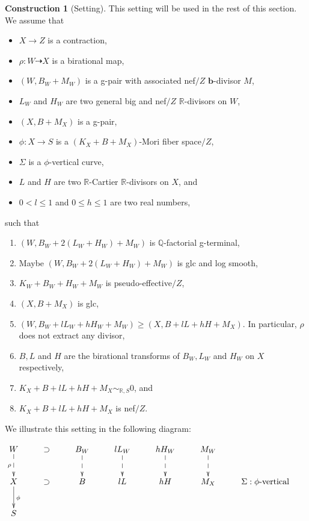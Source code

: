 \documentclass[11pt]{amsart}
\numberwithin{equation}{section}
\newcommand{\bb}{\bm{b}}
\newcommand{\Qq}{\mathbb{Q}}
\newcommand{\Rr}{\mathbb{R}}
\theoremstyle{definition}
\theoremstyle{definition}
\newtheorem{cons}[thm]{Construction}
\theoremstyle{definition}
\begin{document}
\begin{cons}[Setting]\label{cons: setting for sarkisov link}
This setting will be used in the rest of this section. We assume that
\begin{itemize}
    \item $X\rightarrow Z$ is a contraction,
    \item $\rho: W\dashrightarrow X$ is a birational map,
    \item $(W,B_W+M_W)$ is a g-pair with associated nef$/Z$ $\bb$-divisor $M$,
    \item $L_W$ and $H_W$ are two general big and nef$/Z$ $\Rr$-divisors on $W$, 
    \item $(X,B+M_X)$ is a g-pair, 
    \item $\phi: X\rightarrow S$ is a $(K_X+B+M_X)$-Mori fiber space$/Z$,
    \item $\Sigma$ is a $\phi$-vertical curve,
    \item $L$ and $H$ are two $\Rr$-Cartier $\Rr$-divisors on $X$, and
    \item $0<l\leq 1$ and $0\leq h\leq 1$ are two real numbers,
\end{itemize} 
such that
\begin{enumerate}
    \item $(W,B_W+2(L_W+H_W)+M_W)$ is $\Qq$-factorial g-terminal, 
    \item Maybe $(W,B_W+2(L_W+H_W)+M_W)$ is glc and log smooth, 
    \item $K_W+B_W+H_W+M_W$ is pseudo-effective$/Z$,
    \item $(X,B+M_X)$ is glc,
    \item $(W,B_W+lL_W+hH_W+M_W)\geq (X,B+lL+hH+M_X)$. In particular, $\rho$ does not extract any divisor,
    \item $B,L$ and $H$ are the birational transforms of $B_W,L_W$ and $H_W$ on $X$ respectively,
    \item $K_X+B+lL+hH+M_X\sim_{\mathbb R,S}0$, and
    \item $K_X+B+lL+hH+M_X$ is nef$/Z$.
\end{enumerate}
We illustrate this setting in the following diagram:
\medskip

\begin{center}$\xymatrix{
  W\ar@{-->}[d]_{\rho}&\supset & B_W\ar@{-->}[d] &lL_W\ar@{-->}[d] &hH_W\ar@{-->}[d] &M_W\ar@{-->}[d] &\\
      X \ar@{->}[d]^{\phi}&\supset & B &lL &hH &M_X  &\Sigma:\phi\text{-vertical}    \\
    S & }$
\end{center}
\end{cons}
\end{document}
